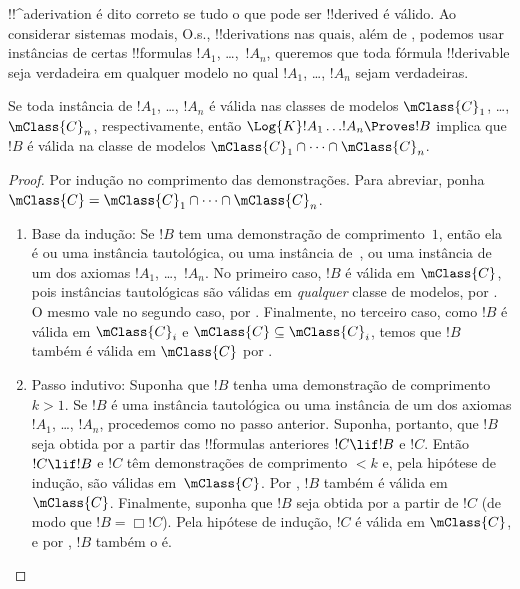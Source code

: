 \documentclass[../../../include/open-logic-section]{subfiles}
\begin{document}


!!^a{derivation} é dito correto se tudo o que pode ser !!{derive}d é
válido. Ao considerar sistemas modais, O.s.\@, !!{derivation}s nas
quais, além de , podemos usar instâncias de certas !!{formula}s
$!A_1$, \dots,~$!A_n$, queremos que toda fórmula !!{derivable} seja
verdadeira em qualquer modelo no qual $!A_1$, \dots, $!A_n$ sejam
verdadeiras.

\begin{thm}
  Se toda instância de $!A_1$, \dots, $!A_n$ é válida nas classes de
  modelos $\mClass{C}_1$, \dots, $\mClass{C}_n$, respectivamente,
  então $\Log{K}!A_1\dots !A_n \Proves !B$ implica que $!B$ é válida
  na classe de modelos
  $\mClass{C}_1 \cap \dots \cap \mClass{C}_n$.
\end{thm}

\begin{proof}
  Por indução no comprimento das demonstrações. Para abreviar, ponha $\mClass{C} =
  \mClass{C}_1 \cap \dots \cap \mClass{C}_n$.
  \begin{enumerate}
  \item Base da indução: Se $!B$ tem uma demonstração de
    comprimento~$1$, então ela é ou uma instância tautológica, ou uma
    instância de~, ou uma
    instância de um dos axiomas $!A_1$, \dots,~$!A_n$. No primeiro
    caso, $!B$ é válida em $\mClass{C}$, pois instâncias tautológicas
    são válidas em \emph{qualquer} classe de modelos, por
    . O mesmo vale no segundo caso,
    por . Finalmente, no terceiro
    caso, como $!B$ é válida em $\mClass{C}_i$ e $\mClass{C} \subseteq
    \mClass{C}_i$, temos que $!B$ também é válida em $\mClass{C}$ por
    .
  \item Passo indutivo: Suponha que $!B$ tenha uma demonstração de
    comprimento $k>1$. Se $!B$ é uma instância tautológica ou uma
    instância de um dos axiomas $!A_1$, \dots, $!A_n$, procedemos como
    no passo anterior. Suponha, portanto, que $!B$ seja obtida por
    \MP{} a partir das !!{formula}s anteriores $!C \lif !B$ e $!C$.
    Então $!C \lif !B$ e $!C$ têm demonstrações de comprimento $<k$ e,
    pela hipótese de indução, são válidas em~$\mClass{C}$. Por
    , $!B$ também é válida em
    $\mClass{C}$. Finalmente, suponha que $!B$ seja obtida por \Nec{}
    a partir de $!C$ (de modo que $!B = \Box!C$). Pela hipótese de
    indução, $!C$ é válida em $\mClass{C}$, e por
    , $!B$ também o é.
  \end{enumerate}
\end{proof}
\end{document}
